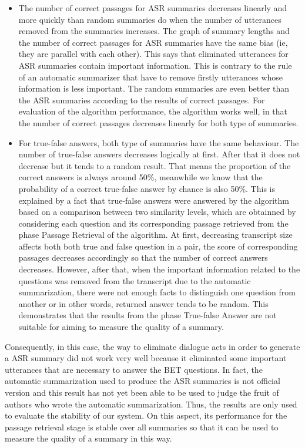 \begin{itemize}
\item {The number of correct passages for ASR summaries decreases linearly and more quickly than random summaries do when the number of utterances removed from the summaries increases. The graph of summary lengths and the number of correct passages for ASR summaries have the same bias (ie, they are parallel with each other). This says that eliminated utterances for ASR summaries contain important information. This is contrary to the rule of an automatic summarizer that have to remove firstly utterances whose information is less important. The random summaries are even better than the ASR summaries according to the results of correct passages. For evaluation of the algorithm performance, the algorithm works well, in that the number of correct passages decreases linearly for both type of summaries. }
\item {For true-false answers, both type of summaries have the same behaviour. The number of true-false answers decreases logically at first. After that it does not decrease but it tends to a random result. That means the proportion of the correct answers is always around 50\%, meanwhile we know that the probability of a correct true-false answer by chance is also 50\%. This is explained by a fact that true-false answers were answered by the algorithm based on a comparison between two similarity levels, which are obtainned by considering each question and its corresponding passage retrieved from the phase Passage Retrieval of the algorithm. At first, decreasing transcript size affects both both true and false question in a pair, the score of corresponding passages decreases accordingly so that the number of correct answers decreases. However, after that, when the important information related to the questions was removed from the transcript due to the automatic summarization, there were not enough facts to distinguish one question from another or in other words, returned answer tends to be random. This demonstrates that the results from the phase True-false Answer are not suitable for aiming to measure the quality of a summary.}

\end{itemize}

Consequently, in this case, the way to eliminate dialogue acts in order to generate a ASR summary did not work very well because it eliminated some important utterances that are necessary to answer the BET questions. In fact, the automatic summarization used to produce the ASR summaries is not official version and this result has not yet been able to be used to judge the fruit of authors  who wrote the automatic summarization. Thus, the results are only used to evaluate the stability of our system. On this aspect, its performance for the passage retrieval stage is stable over all summaries so that it can be used to measure the quality of a summary in this way. 




